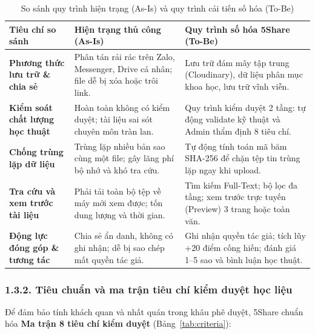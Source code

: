 \begin{table}[htbp]
\centering
\small
\caption{So sánh quy trình hiện trạng (As-Is) và quy trình cải tiến số hóa (To-Be)}
\label{tab:as_is_to_be}
\begin{tabularx}{\textwidth}{|p{2.5cm}|X|X|}
\hline
\textbf{Tiêu chí so sánh} & \textbf{Hiện trạng thủ công (As-Is)} & \textbf{Quy trình số hóa 5Share (To-Be)} \\
\hline
\textbf{Phương thức lưu trữ \& chia sẻ} & Phân tán rải rác trên Zalo, Messenger, Drive cá nhân; file dễ bị xóa hoặc trôi link. & Lưu trữ đám mây tập trung (Cloudinary), dữ liệu phân mục khoa học, lưu trữ vĩnh viễn. \\
\hline
\textbf{Kiểm soát chất lượng học thuật} & Hoàn toàn không có kiểm duyệt; tài liệu sai sót chuyên môn tràn lan. & Quy trình kiểm duyệt 2 tầng: tự động validate kỹ thuật và Admin thẩm định 8 tiêu chí. \\
\hline
\textbf{Chống trùng lặp dữ liệu} & Trùng lặp nhiều bản sao cùng một file; gây lãng phí bộ nhớ và khó tra cứu. & Tự động tính toán mã băm SHA-256 để chặn tệp tin trùng lặp ngay khi upload. \\
\hline
\textbf{Tra cứu và xem trước tài liệu} & Phải tải toàn bộ tệp về máy mới xem được; tốn dung lượng và thời gian. & Tìm kiếm Full-Text; bộ lọc đa tầng; xem trước trực tuyến (Preview) 3 trang hoặc toàn văn. \\
\hline
\textbf{Động lực đóng góp \& tương tác} & Chia sẻ ẩn danh, không có ghi nhận; dễ bị sao chép mất quyền tác giả. & Ghi nhận quyền tác giả; tích lũy +20 điểm cống hiến; đánh giá 1--5 sao và bình luận học thuật. \\
\hline
\end{tabularx}
\end{table}

\subsubsection{1.3.2. Tiêu chuẩn và ma trận tiêu chí kiểm duyệt học liệu}
Để đảm bảo tính khách quan và nhất quán trong khâu phê duyệt, 5Share chuẩn hóa \textbf{Ma trận 8 tiêu chí kiểm duyệt} (Bảng~\ref{tab:criteria}):

